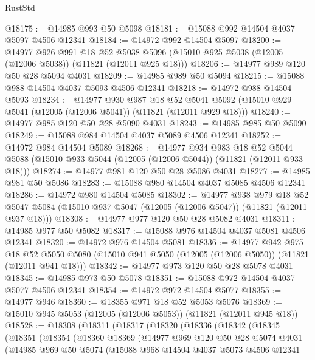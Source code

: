 \begin{lexlean}{RustStd}
\begin{coremodule}
@18175 := @14985 @993 @50 @5098
@18181 := @15088 @992 @14504 @4037 @5097 @4506 @12341
@18184 := @14972 @992 @14504 @5097
@18200 := @14977
    @926
    @991
    @18
    @52
    @5038
    @5096
    (@15010 @925 @5038 (@12005 (@12006 @5038)) (@11821 (@12011 @925 @18)))
@18206 := @14977 @989 @120 @50 @28 @5094 @4031
@18209 := @14985 @989 @50 @5094
@18215 := @15088 @988 @14504 @4037 @5093 @4506 @12341
@18218 := @14972 @988 @14504 @5093
@18234 := @14977
    @930
    @987
    @18
    @52
    @5041
    @5092
    (@15010 @929 @5041 (@12005 (@12006 @5041)) (@11821 (@12011 @929 @18)))
@18240 := @14977 @985 @120 @50 @28 @5090 @4031
@18243 := @14985 @985 @50 @5090
@18249 := @15088 @984 @14504 @4037 @5089 @4506 @12341
@18252 := @14972 @984 @14504 @5089
@18268 := @14977
    @934
    @983
    @18
    @52
    @5044
    @5088
    (@15010 @933 @5044 (@12005 (@12006 @5044)) (@11821 (@12011 @933 @18)))
@18274 := @14977 @981 @120 @50 @28 @5086 @4031
@18277 := @14985 @981 @50 @5086
@18283 := @15088 @980 @14504 @4037 @5085 @4506 @12341
@18286 := @14972 @980 @14504 @5085
@18302 := @14977
    @938
    @979
    @18
    @52
    @5047
    @5084
    (@15010 @937 @5047 (@12005 (@12006 @5047)) (@11821 (@12011 @937 @18)))
@18308 := @14977 @977 @120 @50 @28 @5082 @4031
@18311 := @14985 @977 @50 @5082
@18317 := @15088 @976 @14504 @4037 @5081 @4506 @12341
@18320 := @14972 @976 @14504 @5081
@18336 := @14977
    @942
    @975
    @18
    @52
    @5050
    @5080
    (@15010 @941 @5050 (@12005 (@12006 @5050)) (@11821 (@12011 @941 @18)))
@18342 := @14977 @973 @120 @50 @28 @5078 @4031
@18345 := @14985 @973 @50 @5078
@18351 := @15088 @972 @14504 @4037 @5077 @4506 @12341
@18354 := @14972 @972 @14504 @5077
@18355 := @14977 @946
@18360 := @18355 @971 @18 @52 @5053 @5076
@18369 := @15010 @945 @5053 (@12005 (@12006 @5053)) (@11821 (@12011 @945 @18))
@18528 := @18308
    (@18311
      (@18317
        (@18320
          (@18336
            (@18342
              (@18345
                (@18351
                  (@18354
                    (@18360
                      @18369
                      (@14977
                        @969
                        @120
                        @50
                        @28
                        @5074
                        @4031
                        (@14985
                          @969
                          @50
                          @5074
                          (@15088
                            @968
                            @14504
                            @4037
                            @5073
                            @4506
                            @12341

\end{coremodule}
\end{lexlean}
